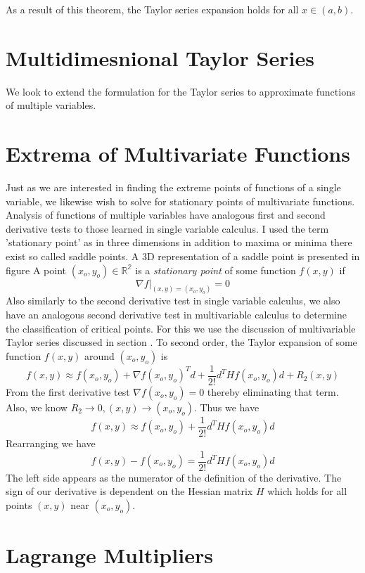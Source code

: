 As a result of this theorem, the Taylor series expansion holds for all $x \in (a,b)$.

\section{Multidimesnional Taylor Series}
We look to extend the formulation for the Taylor series to approximate functions of multiple variables. 

\section{Extrema of Multivariate Functions}
Just as we are interested in finding the extreme points of functions of a single variable, we likewise wish to solve for stationary points of multivariate functions. Analysis of functions of multiple variables have analogous first and second derivative tests to those learned in single variable calculus. I used the term 'stationary point' as in three dimensions in addition to maxima or minima there exist so called 
saddle points. A 3D representation of a saddle point is presented in figure 
 {A point $(x_o, y_o) \in \mathbb{R^2}$ is a \textit{stationary point} of some function $f(x,y)$ if
\[\nabla f \rvert_{(x, y) = (x_o, y_o)} = 0\]}
Also similarly to the second derivative test in single variable calculus, we also have an analogous second derivative test in multivariable calculus to determine the classification of critical points. For this we use the discussion of multivariable Taylor series discussed in section . To second order, the Taylor expansion of some function $f(x,y)$ around $(x_o, y_o)$ is
\[f(x,y) \approx f(x_o, y_o) + \nabla f(x_o, y_o)^T d + \frac{1}{2!}d^THf(x_o,y_o)d + R_2(x,y)\]
From the first derivative test $\nabla f(x_o, y_o) = 0$ thereby eliminating that term. Also, we know $R_2 \rightarrow 0, (x,y) \rightarrow (x_o, y_o)$. Thus we have
\[f(x,y) \approx f(x_o, y_o) + \frac{1}{2!}d^THf(x_o,y_o)d \]
Rearranging we have 
\[f(x,y) - f(x_o, y_o) = \frac{1}{2!}d^THf(x_o,y_o)d \]
The left side appears as the numerator of the definition of the derivative. The sign of our derivative is dependent on the Hessian matrix $H$ which holds for all points $(x,y)$ near $(x_o, y_o)$. 
\section{Lagrange Multipliers}

